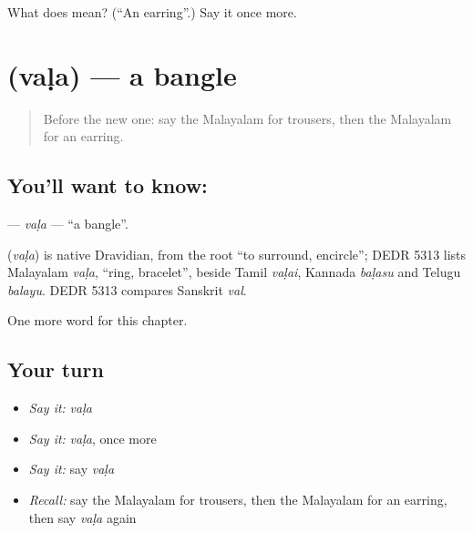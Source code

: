\begin{tcolorbox}[breakable,colback=teal!4,colframe=teal!35!black,title={Before you move on}]
What does  mean? (\textquotedblleft{}An earring\textquotedblright{}.) Say it once more.
\end{tcolorbox}
\section[\texorpdfstring{\ml{വള} (vaḷa)}{വള (vaḷa)}]{ (vaḷa) — a bangle}

\label{lesson:ML-C156-vala}



\begin{quote}
Before the new one: say the Malayalam for trousers, then the Malayalam for an earring.
\end{quote}

\subsection*{You'll want to know: }
\textbf{} — \emph{vaḷa} — \textquotedblleft{}a bangle\textquotedblright{}.

\begin{cousinweb}
\textbf{} (\emph{vaḷa}) is native Dravidian, from the root \textquotedblleft{}to surround, encircle\textquotedblright{}; DEDR 5313 lists Malayalam \emph{vaḷa}, \textquotedblleft{}ring, bracelet\textquotedblright{}, beside Tamil \emph{vaḷai}, Kannada \emph{baḷasu} and Telugu \emph{balayu}. DEDR 5313 compares Sanskrit \emph{val}.
\end{cousinweb}

\begin{grammarlens}[title={What you've built}]
One more word for this chapter.
\end{grammarlens}

\subsection*{Your turn}
\begin{itemize}
\raggedright
  \item \emph{Say it:} \emph{vaḷa}
  \item \emph{Say it:} \emph{vaḷa}, once more
  \item \emph{Say it:} say \emph{vaḷa}
  \item \emph{Recall:} say the Malayalam for trousers, then the Malayalam for an earring, then say \emph{vaḷa} again
\end{itemize}

